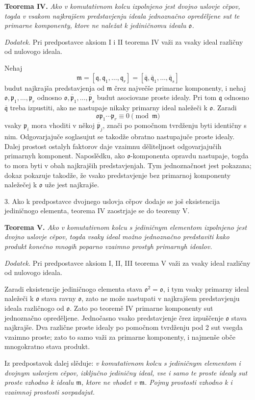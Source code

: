 \documentclass[11pt]{article}
\providecommand{\mm}{\mathfrak{m}}
\providecommand{\mo}{\mathfrak{o}}
\providecommand{\mq}{\mathfrak{q}}
\providecommand{\mpideal}{\mathfrak{p}}
\providecommand{\mbar}[1]{\overline{#1}}
\begin{document}
\textbf{Teorema IV.} \emph{Ako v komutativnom kolcu izpolnjeno jest dvojno uslovje cěpov, togda v vsakom najkrajšem predstavjenju ideala jednoznačno opreděljene sut te primarne komponenty, ktore ne naležat k jediničnomu idealu $\mo$.}

\emph{Dodatek.} Pri predpostavce aksiom I i II teorema IV važi za vsaky ideal različny od nulovogo ideala.

Nehaj
\[
\mm=[\mq,\mq_1,\ldots,\mq_r]=[\mbar\mq,\mbar\mq_1,\ldots,\mbar\mq_s]
\]
budut najkrajša predstavjenja od $\mm$ črez največše primarne komponenty, i nehaj $\mo,\mpideal_1,\ldots,\mpideal_r$ odnosno $\mo,\mbar\mpideal_1,\ldots,\mbar\mpideal_s$ budut asociovane proste idealy. Pri tom $\mq$ odnosno $\mbar\mq$ treba izpustiti, ako ne nastupaje nikaky primarny ideal naležeči k $\mo$. Zaradi
\[
\mo\mpideal_1\cdots\mpideal_r\equiv0\pmod{\mm}
\]
vsaky $\mpideal_i$ mora vhoditi v někoj $\mbar\mpideal_j$, znači po pomočnom tvrdženju byti identičny s nim. Odgovarjajuče soglasujut se takodže obratno nastupajuče proste idealy. Dalej prostost ostalyh faktorov daje vzaimnu děliteljnost odgovarjajučih primarnyh komponent. Naposlědku, ako $\mo$-komponenta opravdu nastupaje, togda to mora byti v obah najkrajših predstavjenjah. Tym jednoznačnost jest pokazana; dokaz pokazuje takodže, že vsako predstavjenje bez primarnoj komponenty naležečej k $\mo$ uže jest najkrajše.

3. Ako k predpostavce dvojnego uslovja cěpov dodaje se još eksistencija jediničnogo elementa, teorema IV zaostrjaje se do teoremy V.

\textbf{Teorema V.} \emph{Ako v komutativnom kolcu s jediničnym elementom izpolnjeno jest dvojno uslovje cěpov, togda vsaky ideal možno jednoznačno predstaviti kako produkt konečno mnogih poparno vzaimno prostyh primarnyh idealov.}

\emph{Dodatek.} Pri predpostavce aksiom I, II, III teorema V važi za vsaky ideal različny od nulovogo ideala.

Zaradi eksistencije jediničnogo elementa stava $\mo^2=\mo$, i tym vsaky primarny ideal naležeči k $\mo$ stava ravny $\mo$, zato ne može nastupati v najkrajšem predstavjenju ideala različnogo od $\mo$. Zato po teoremě IV primarne komponenty sut jednoznačno opreděljene. Jednočasno vsako predstavjenje črez izpuščenje $\mo$ stava najkrajše. Dva različne proste idealy po pomočnom tvrdženju pod 2 sut vsegda vzaimno proste; zato to samo važi za primarne komponenty, i najmenše obče mnogokratno stava produkt.

Iz predpostavok dalej slěduje: \emph{v komutativnom kolcu s jediničnym elementom i dvojnym uslovjem cěpov, izključno jediničny ideal, vse i samo te proste idealy sut proste vzhodno k idealu $\mm$, ktore ne vhodet v $\mm$. Pojmy prostosti vzhodno k i vzaimnoj prostosti sovpadajut.}
\end{document}
